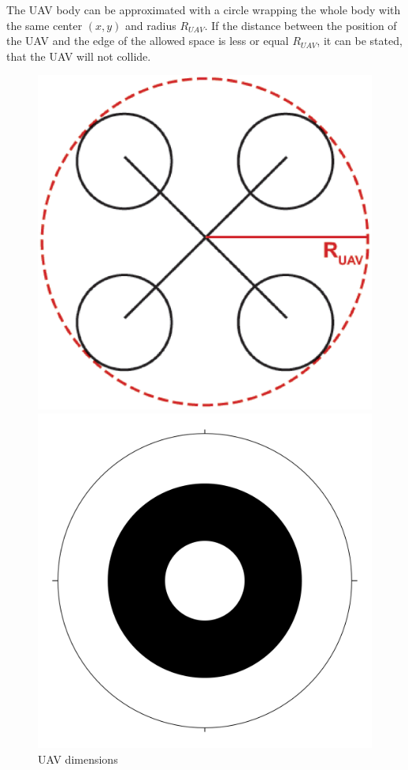 \documentclass[a4paper,11pt,titlepage]{article}
\begin{document}
The UAV body can be approximated with a circle wrapping the whole body with the same center $(x, y)$ and radius $R_{UAV}$. If the distance between the position of the UAV and the edge of the allowed space is less or equal $R_{UAV}$, it can be stated, that the UAV will not collide. 



\begin{figure}[h]
\centering
\begin{minipage}{0.48\textwidth}
  \centering
  \includegraphics[width=1\linewidth]{fig/UAV_dimensions.eps}
  \caption{UAV dimensions}
  \label{fig:UAV_dimensions}
\end{minipage}
\begin{minipage}{0.48\textwidth}
  \centering
  \includegraphics[width=1\linewidth]{fig/blob.png}

\end{minipage}
\end{figure}
\end{document}
